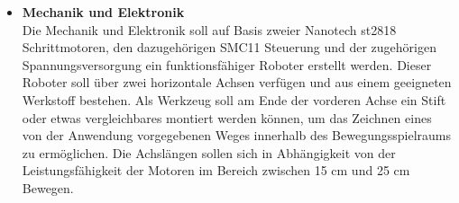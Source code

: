 \begin{itemize}
\begin{itemize}
\item \textbf{Mechanik und Elektronik}\\
Die Mechanik und Elektronik soll auf Basis zweier Nanotech st2818 Schrittmotoren, den dazugehörigen SMC11 Steuerung und der zugehörigen Spannungsversorgung ein funktionsfähiger Roboter erstellt werden. Dieser Roboter soll über zwei horizontale Achsen verfügen und aus einem geeigneten Werkstoff bestehen. Als Werkzeug soll am Ende der vorderen Achse ein Stift oder etwas vergleichbares montiert werden können, um das Zeichnen eines von der Anwendung vorgegebenen Weges innerhalb des Bewegungsspielraums zu ermöglichen. Die Achslängen sollen sich in Abhängigkeit von der Leistungsfähigkeit der Motoren im Bereich zwischen 15 cm und 25 cm Bewegen.
\end{itemize}  
\end{itemize}  

 


